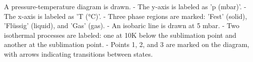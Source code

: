 A pressure-temperature diagram is drawn.  
- The y-axis is labeled as 'p (mbar)'.  
- The x-axis is labeled as 'T (°C)'.  
- Three phase regions are marked: 'Fest' (solid), 'Flüssig' (liquid), and 'Gas' (gas).  
- An isobaric line is drawn at 5 mbar.  
- Two isothermal processes are labeled: one at 10K below the sublimation point and another at the sublimation point.  
- Points 1, 2, and 3 are marked on the diagram, with arrows indicating transitions between states.